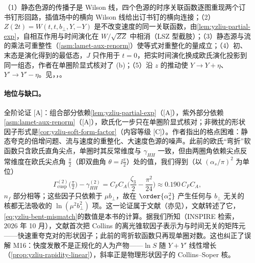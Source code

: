 \begin{proofsketch}
（1）静态色源的传播子是 Wilson 线，四个色源的时序关联函数逐图重现两个订书钉形回路，插值场中的横向 Wilson 线给出订书钉的横向连接；（2）$Z(2t)=W(t,t,b_\perp,Y,-Y)$ 是不改变速度的同一关联函数，由\cref{lem:yzliu-partial-exp}，自相互作用与时间演化在 $W/\sqrt{ZZ}$ 中相消（LSZ 型截肢）；（3）静态源与流的乘法可重整性（\cref{asm:lamet-aux-renorm}）使等式对重整化的量成立；（4）初、末态是演化得到的最低态，$J$ 只作用于 $t=0$，把实时间演化换成欧氏演化投影到同一组态，作者在单圈阶显式核对了 (b)\cite[式~(12)--(13)]{Ji:2019sxk}；（5）沿 $z$ 的推动使 $Y\to Y+\eta$、$Y'\to Y'-\eta$。见\cite[式~(1)--(13)]{Ji:2019sxk}，\cite[第~4.1--4.2~节、附录~A]{Liu:2022nnk}，\cite[第~V.C~节]{JiEtAl2021}。
\end{proofsketch}

\paragraph{地位与缺口。}全阶论证 [A]：组合部分依赖\cref{lem:yzliu-partial-exp}（[A]），紫外部分依赖\cref{asm:lamet-aux-renorm}（[A]），欧氏化一步只在单圈阶显式核对；非微扰的形状因子形式是\cref{cor:yzliu-soft-form-factor}（内容等级 [C]）。作者指出的格点困难：静态夸克的倍增问题、流与速度的重整化、大速度色源的噪声\cite{Ji:2019sxk}。此前的欧氏“弯折”软函数\cite{Ji:2014hxa,Ebert:2019okf}只含欧氏直角尖点，单圈时其反常维度与 $\gamma_{HH}$ 一致，但由两圈角依赖尖点反常维度\cite{KorchemskyRadyushkin1987}在欧氏尖点角 $\frac\pi2$（即双曲角 $\theta=\ii\frac\pi2$）处的值，我们得到（以 $(\alpha_s/\pi)^2$ 为单位）%
\begin{equation}\label{eq:yzliu-bent-mismatch}
\Gamma^{(2)}_{\mathrm{cusp}}\big(\tfrac\pi2\big)-\gamma^{(2)}_{HH}=C_FC_A\Big(\frac{\zeta_3}{2}-\frac{\pi^2}{24}\Big)\approx0.190\,C_FC_A ,
\end{equation}
$n_f$ 部分相等；这些因子只依赖于 $\mu b_\perp$，故在 $\order{\alpha_s^2}$ 产生任何与 $b_\perp$ 无关的核都无法吸收的 $\ln(\mu^2b_\perp^2)$ 项。这一论证属于文献\cite{Ji:2019sxk}（亦见\cite{Ji:2019ewn}），文献\cite{Ebert:2022fmh}转述了它，\cref{eq:yzliu-bent-mismatch}的数值是本书的计算。据我们所知（INSPIRE 检索，2026 年 10 月），文献\cite{Ji:2019sxk}首次把 Collins 的离光锥软因子表示为与时间无关的矩阵元——快速重夸克对的形状因子；此前的弯折软函数只再现单圈对数。这也纠正了误解 M16：快度发散不是正规化的人为产物——$\ln S$ 随 $Y+Y'$ 线性增长（\cref{prop:yzliu-rapidity-linear}），斜率正是物理形状因子的 Collins--Soper 核。

